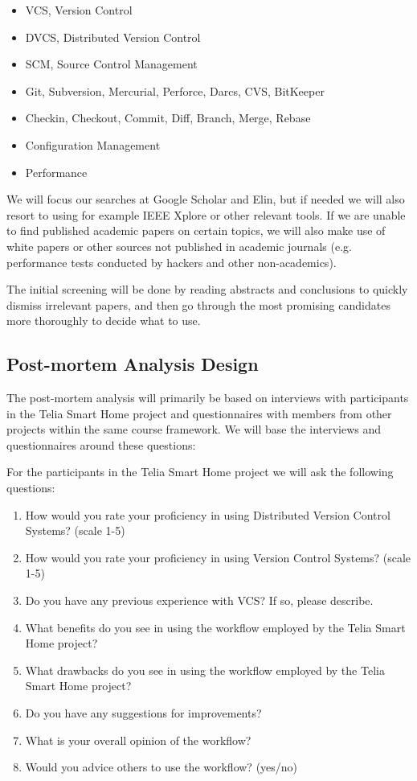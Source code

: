 \documentclass{llncs}
\begin{document}
\begin{itemize}
 \item VCS, Version Control
 \item DVCS, Distributed Version Control
 \item SCM, Source Control Management
 \item Git, Subversion, Mercurial, Perforce, Darcs, CVS, BitKeeper
 \item Checkin, Checkout, Commit, Diff, Branch, Merge, Rebase
 \item Configuration Management
 \item Performance
\end{itemize}

We will focus our searches at Google Scholar and Elin, but if needed
we will also resort to using for example IEEE Xplore or other relevant
tools. If we are unable to find published academic papers on certain
topics, we will also make use of white papers or other sources not
published in academic journals (e.g. performance tests conducted by
hackers and other non-academics).

The initial screening will be done by reading abstracts and
conclusions to quickly dismiss irrelevant papers, and then go through
the most promising candidates more thoroughly to decide what to use.

\subsection{Post-mortem Analysis Design}

The post-mortem analysis will primarily be based on interviews with
participants in the Telia Smart Home project and questionnaires with
members from other projects within the same course framework. We will
base the interviews and questionnaires around these questions:

For the participants in the Telia Smart Home project we will ask the
following questions:

\begin{enumerate}
 \item How would you rate your proficiency in using Distributed
       Version Control Systems? (scale 1-5)
 \item How would you rate your proficiency in using Version Control
       Systems? (scale 1-5)
 \item Do you have any previous experience with VCS? If so, please
       describe.
 \item What benefits do you see in using the workflow employed by the
       Telia Smart Home project?
 \item What drawbacks do you see in using the workflow employed by the
       Telia Smart Home project?
 \item Do you have any suggestions for improvements?
 \item What is your overall opinion of the workflow?
 \item Would you advice others to use the workflow? (yes/no)
\end{enumerate}
\end{document}
